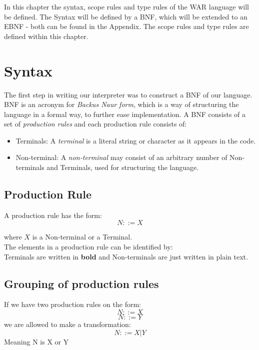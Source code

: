 In this chapter the syntax, scope rules and type rules of the WAR language will be defined. The Syntax will be defined by a BNF, which will be extended to an EBNF - both can be found in the Appendix. The scope rules and type rules are defined within this chapter.
\section{Syntax}
	The first step in writing our interpreter was to construct a BNF of our language. 
	BNF is an acronym for {\it Backus Naur form}, which is a way of
	structuring the language in a formal way, to further ease implementation. 
	A BNF consists of a set of {\it production rules} and each
	production rule consists of: \\
	\begin{itemize}
		 \item Terminals: A {\it terminal } is a literal string or character as it appears in the code.
		 \item Non-terminal: A {\it non-terminal } may consist of an arbitrary number of Non-terminals and Terminals, used for structuring the language.
	\end{itemize}
	
	\subsection*{Production Rule}
		A production rule has the form: \\
		\begin{equation}
			N ::= X
		\end{equation}
		
		where $X$ is a Non-terminal or a Terminal. \\
		
		The elements in a production rule can be identified by: \\
		Terminals are written in {\bf bold } and 
		Non-terminals are just written in plain text.
	\subsection*{Grouping of production rules}
		If we have two production rules on the form:\\
		\begin{equation}
			N ::= X 
		\end{equation}
		\begin{equation}
			N ::= Y 
		\end{equation}
		we are allowed to make a transformation: \\
		\begin{equation}
			N ::= X | Y 
		\end{equation}
		Meaning N is X or Y \\
		
